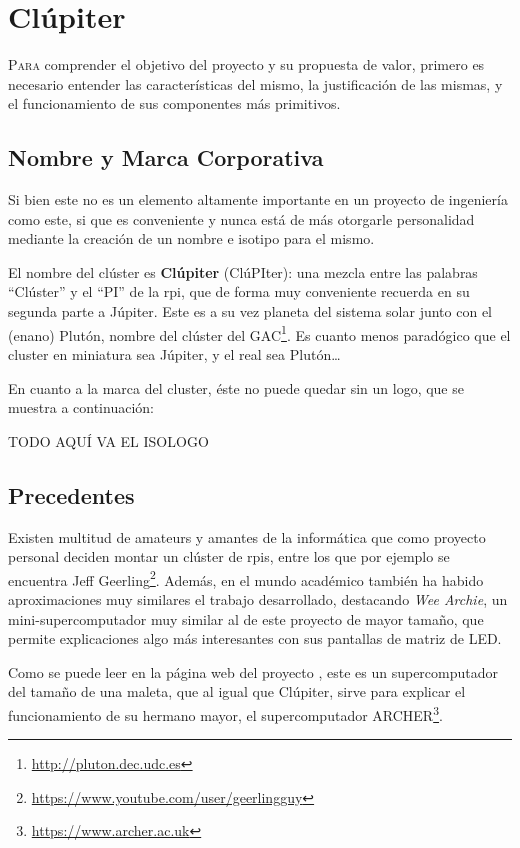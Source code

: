 \chapter{Clúpiter}
\label{chap:conceptos_basicos}

\lettrine{P}{ara} comprender el objetivo del proyecto y su propuesta de valor, primero es necesario entender las características del mismo, la justificación de las mismas, y el funcionamiento de sus componentes más primitivos.

\section{Nombre y Marca Corporativa}
Si bien este no es un elemento altamente importante en un proyecto de ingeniería como este, si que es conveniente y nunca está de más otorgarle personalidad mediante la creación de un nombre e isotipo para el mismo.

El nombre del clúster es \textbf{Clúpiter} (ClúPIter): una mezcla entre las palabras ``Clúster'' y el ``PI'' de la \acrlong{rpi}, que de forma muy conveniente recuerda en su segunda parte a Júpiter. Este es a su vez planeta del sistema solar junto con el (enano) Plutón, nombre del clúster del GAC\footnote{\url{http://pluton.dec.udc.es}}. Es cuanto menos paradógico que el cluster en miniatura sea Júpiter, y el real sea Plutón\dots

En cuanto a la marca del cluster, éste no puede quedar sin un logo, que se muestra a continuación:

TODO AQUÍ VA EL ISOLOGO %

\section{Precedentes}
Existen multitud de amateurs y amantes de la informática que como proyecto personal deciden montar un clúster de \acrlong{rpi}s, entre los que por ejemplo se encuentra Jeff Geerling\footnote{\url{https://www.youtube.com/user/geerlingguy}}. Además, en el mundo académico también ha habido aproximaciones muy similares el trabajo desarrollado, destacando \textit{Wee Archie}, un mini-supercomputador muy similar al de este proyecto de mayor tamaño, que permite explicaciones algo más interesantes con sus pantallas de matriz de LED.

Como se puede leer en la página web del proyecto \cite{wee_archie_webpage}, este es un supercomputador del tamaño de una maleta, que al igual que Clúpiter, sirve para explicar el funcionamiento de su hermano mayor, el supercomputador ARCHER\footnote{\url{https://www.archer.ac.uk}}.

